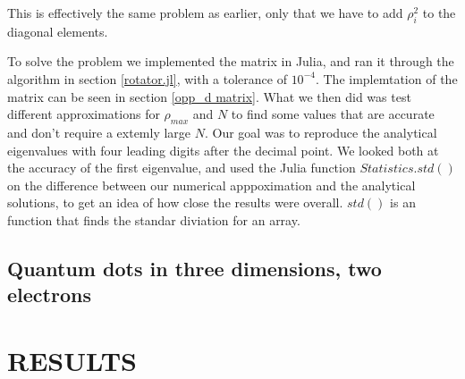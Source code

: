\documentclass[a4paper]{article}
\begin{document}
This is effectively the same problem as earlier, only that we have to add $\rho_{i}^2$ to the diagonal elements. 

To solve the problem we implemented the matrix in Julia, and ran it through the algorithm in section \ref{rotator.jl}, with a tolerance of $10^{-4}$. The implemtation of the matrix can be seen in section \ref{opp_d matrix}. What we then did was test different approximations for $\rho_{max}$ and $N$ to find some values that are accurate and don't require a extemly large $N$. Our goal was to reproduce the analytical eigenvalues with four leading digits after the decimal point. We looked both at the accuracy of the first eigenvalue, and used the Julia function $Statistics.std()$ on the difference between our numerical apppoximation and the analytical solutions, to get an idea of how close the results were overall. $std()$ is an function that finds the standar diviation for an array.

\subsection{Quantum dots in three dimensions, two electrons}


\section{RESULTS}
\end{document}
